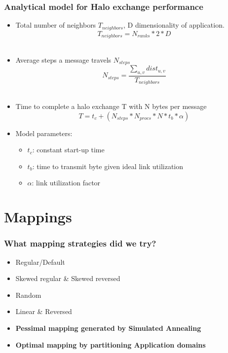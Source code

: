 \documentclass{beamer}
\begin{document}
\begin{frame}
\frametitle{Analytical model for Halo exchange performance}
\begin{itemize}
\item Total number of neighbors $T_{neighbors}$, D dimensionality of application.
\begin{equation}
  T_{neighbors} = N_{ranks} * 2 * D
\end{equation} \\
\item Average steps a message travels $N_{steps}$
\begin{equation}
  N_{steps} = \frac{ \sum\limits_{u,v} dist_{u,v} } {T_{neighbors}}
\end{equation} \\
\item Time to complete a halo exchange T with N bytes per message
\begin{equation}
  T = t_c + (N_{steps} * N_{procs} * N * t_b * \alpha)
\end{equation}
\item Model parameters:
\begin{itemize}
  \item $t_c$: constant start-up time
  \item $t_b$: time to transmit byte given ideal link utilization
  \item $\alpha$: link utilization factor
\end{itemize}
\end{itemize}
\end{frame}

\section{Mappings}
\begin{frame}
\frametitle{What mapping strategies did we try?}
\begin{itemize}
\item Regular/Default
\item Skewed regular \& Skewed reversed
\item Random
\item Linear \& Reversed
\item \textbf{Pessimal mapping generated by Simulated Annealing}
\item \textbf{Optimal mapping by partitioning Application domains}
\end{itemize}
\end{frame}
\end{document}
